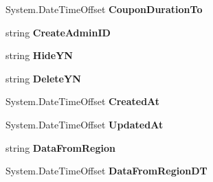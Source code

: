 \begin{DoxyCompactItemize}
\item 
System.\+Date\+Time\+Offset {\bfseries Coupon\+Duration\+To}\hypertarget{a00068_afeccf1c6cedb989e7db5dafffd7e18f1}{}\label{a00068_afeccf1c6cedb989e7db5dafffd7e18f1}

\item 
string {\bfseries Create\+Admin\+ID}\hypertarget{a00068_ab77425562a9f9e4a1c5fc0e808214682}{}\label{a00068_ab77425562a9f9e4a1c5fc0e808214682}

\item 
string {\bfseries Hide\+YN}\hypertarget{a00068_abca82cf2e0e38b5a01ab02b9afbd19d7}{}\label{a00068_abca82cf2e0e38b5a01ab02b9afbd19d7}

\item 
string {\bfseries Delete\+YN}\hypertarget{a00068_a3bb21c3fbbe8203341af855b9cc8dcc0}{}\label{a00068_a3bb21c3fbbe8203341af855b9cc8dcc0}

\item 
System.\+Date\+Time\+Offset {\bfseries Created\+At}\hypertarget{a00068_a46c53bea30a29655bf5a5ba304b75d98}{}\label{a00068_a46c53bea30a29655bf5a5ba304b75d98}

\item 
System.\+Date\+Time\+Offset {\bfseries Updated\+At}\hypertarget{a00068_a056c0befb2979bf383c42022f44f3844}{}\label{a00068_a056c0befb2979bf383c42022f44f3844}

\item 
string {\bfseries Data\+From\+Region}\hypertarget{a00068_adf1ace080733b7c867007bab53d80f32}{}\label{a00068_adf1ace080733b7c867007bab53d80f32}

\item 
System.\+Date\+Time\+Offset {\bfseries Data\+From\+Region\+DT}\hypertarget{a00068_a8d935381ac3e30900028025a0d750a91}{}\label{a00068_a8d935381ac3e30900028025a0d750a91}


\end{DoxyCompactItemize}
